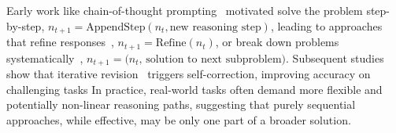 Early work like chain-of-thought prompting~\citep{wei2022chain} motivated solve the problem step-by-step, $n_{t+1} = \text{AppendStep}(n_t, \text{new reasoning step})$, leading to approaches that refine responses~\citep{madaan2023selfrefine}, $n_{t+1} = \text{Refine}(n_t)$, or break down problems systematically~\citep{zhou2023leasttomostpromptingenablescomplex, zelikman2022star}, $n_{t+1} = \bigl(n_t,\, \text{solution to next subproblem}\bigr)$. Subsequent studies show that iterative revision~\citep{chen2024teaching, gou2024critic,chen2025iterativedeepeningsamplinglarge, snell2024scaling} triggers self-correction, improving accuracy on challenging tasks
In practice, real-world tasks often demand more flexible and potentially non-linear reasoning paths, suggesting that purely sequential approaches, while effective, may be only one part of a broader solution.


